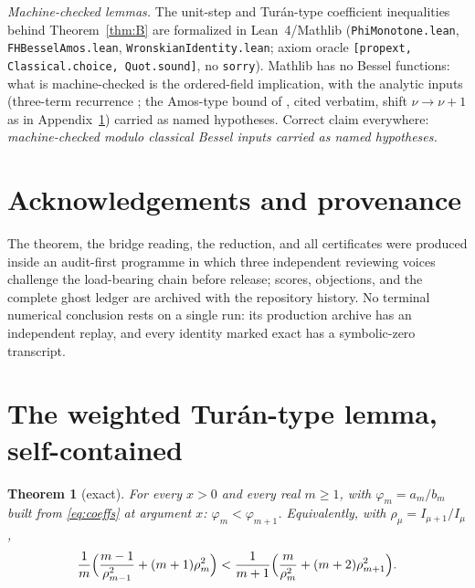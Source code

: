 \documentclass[11pt]{article}
\newtheorem{theorem}{Theorem}
\theoremstyle{remark}
\begin{document}
\begin{sloppypar}
\emph{Machine-checked lemmas.} The unit-step and Tur\'an-type coefficient
inequalities behind Theorem~\ref{thm:B} are formalized in Lean~4/Mathlib
(\texttt{PhiMonotone.lean}, \texttt{FHBesselAmos.lean},
\texttt{WronskianIdentity.lean}; axiom oracle
\texttt{[propext, Classical.choice, Quot.sound]}, no \texttt{sorry}).
Mathlib has no Bessel functions: what is machine-checked is the
ordered-field implication, with the analytic inputs (three-term
recurrence \cite[10.29.1]{DLMF}; the Amos-type bound of
\cite{Amos,Segura2011,RuizSegura}, cited verbatim, shift
$\nu\to\nu+1$ as in Appendix~\ref{app:phi}) carried as named
hypotheses. Correct claim everywhere: \emph{machine-checked modulo
classical Bessel inputs carried as named hypotheses.}
\end{sloppypar}

\section*{Acknowledgements and provenance}
The theorem, the bridge reading, the reduction, and all certificates
were produced inside an audit-first programme in which three independent
reviewing voices challenge the load-bearing chain before release; scores,
objections, and the complete ghost ledger are archived with the
repository history. No terminal numerical conclusion rests on a single
run: its production archive has an independent replay, and every identity
marked exact has a symbolic-zero transcript.

\appendix

\section{The weighted Tur\'an-type lemma, self-contained}\label{app:phi}

\begin{theorem}[exact]\label{thm:phi}
For every $x>0$ and every real $m\ge1$, with $\varphi_m=a_m/b_m$ built
from \eqref{eq:coeffs} at argument $x$:\; $\varphi_m<\varphi_{m+1}$.
Equivalently, with $\rho_\mu=I_{\mu+1}/I_\mu$,
\[
\frac1m\Bigl(\frac{m-1}{\rho_{m-1}^2}+(m+1)\rho_m^2\Bigr)
<\frac1{m+1}\Bigl(\frac{m}{\rho_m^2}+(m+2)\rho_{m+1}^2\Bigr).
\]
\end{theorem}
\end{document}
